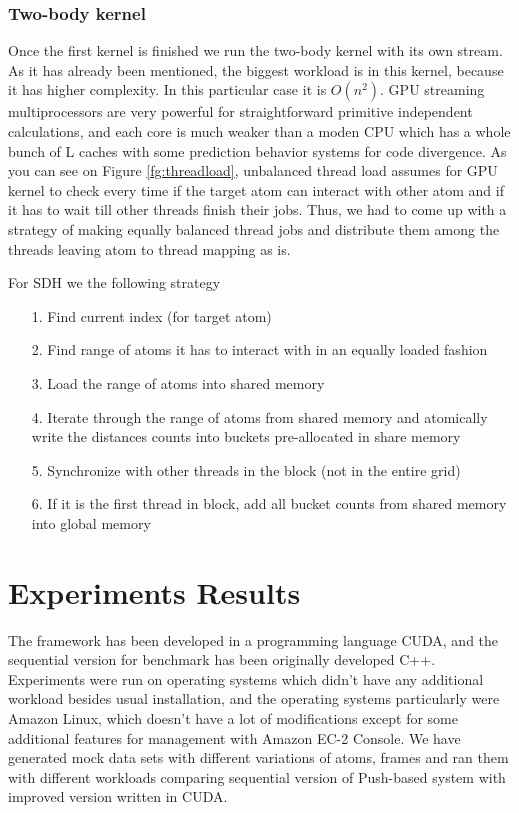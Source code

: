 \documentclass[11pt,a4paper]{report}
\begin{document}
\subsection{Two-body kernel} Once the first kernel is finished we run the two-body kernel with its own stream. As it has already been mentioned, the biggest workload is in this kernel, because it has higher complexity. In this particular case it is $O(n^2)$. GPU streaming multiprocessors are very powerful for straightforward primitive independent calculations, and each core is much weaker than a moden CPU which has a whole bunch of L caches with some prediction behavior systems for code divergence. As you can see on Figure \ref{fg:threadload}, unbalanced thread load assumes for GPU kernel to check every time if the target atom can interact with other atom and if it has to wait till other threads finish their jobs. Thus, we had to come up with a strategy of making equally balanced thread jobs and distribute them among the threads leaving atom to thread mapping as is. 

For SDH we the following strategy

\begin{itemize}
\item[1.] Find current index (for target atom)
\item[2.] Find range of atoms it has to interact with in an equally loaded fashion
\item[3.] Load the range of atoms into shared memory
\item[4.] Iterate through the range of atoms from shared memory and atomically write the distances counts into buckets pre-allocated in share memory
\item[5.] Synchronize with other threads in the block (not in the entire grid)
\item[6.] If it is the first thread in block, add all bucket counts from shared memory into global memory
\end{itemize}



\chapter{Experiments Results}\label{sc:experiments}

The framework has been developed in a programming language CUDA, and the sequential version for benchmark\cite{mainPaper} has been originally developed C++. Experiments were run on operating systems which didn't have any additional workload besides usual installation, and the operating systems particularly were Amazon Linux, which doesn't have a lot of modifications except for some additional features for management with Amazon EC-2 Console. We have generated mock data sets with different variations of atoms, frames and ran them with different workloads comparing sequential version of Push-based system with improved version written in CUDA.
\end{document}
